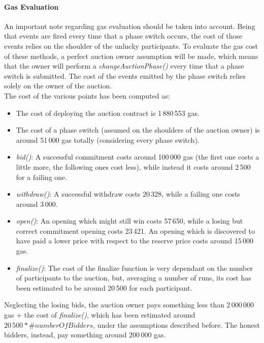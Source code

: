 \documentclass[11pt, a4paper]{report}
\begin{document}
	\paragraph*{Gas Evaluation}
	An important note regarding gas evaluation should be taken into account. Being that events are fired every time that a phase switch occurs, the cost of those events relies on the shoulder of the unlucky participants. To evaluate the gas cost of these methods, a perfect auction owner assumption will be made, which means that the owner will perform a \emph{changeAuctionPhase()} every time that a phase switch is submitted. The cost of the events emitted by the phase switch relies solely on the owner of the auction. \\
	The cost of the various points has been computed as: 
	\begin{itemize}
		\item The cost of deploying the auction contract is 1\,880\,553 gas. 
		\item The cost of a phase switch (assumed on the shoulders of the auction owner) is around 51\,000 gas totally (considering every phase switch).
		\item \emph{bid()}: A successful commitment costs around 100\,000 gas (the first one costs a little more, the following ones cost less), while instead it costs around 2\,500 for a failing one.
		\item \emph{withdraw()}: A successful withdraw costs 20\,328, while a failing one costs around 3\,000.
		\item \emph{open()}: An opening which might still win costs 57\,650, while a losing but correct commitment opening costs 23\,421. An opening which is discovered to have paid a lower price with respect to the reserve price costs around 15\,000 gas.
		\item \emph{finalize()}: The cost of the finalize function is very dependant on the number of participants to the auction, but, averaging a number of runs, its cost has been estimated to be around 20\,500 for each participant.
	\end{itemize}

	Neglecting the losing bids, the auction owner pays something less than 2\,000\,000 gas + the cost of \emph{finalize()}, which has been estimated around $20\,500 * \#numberOfBidders$, under the assumptions described before.
	The honest bidders, instead, pay something around 200\,000 gas.
	
	
\end{document}
